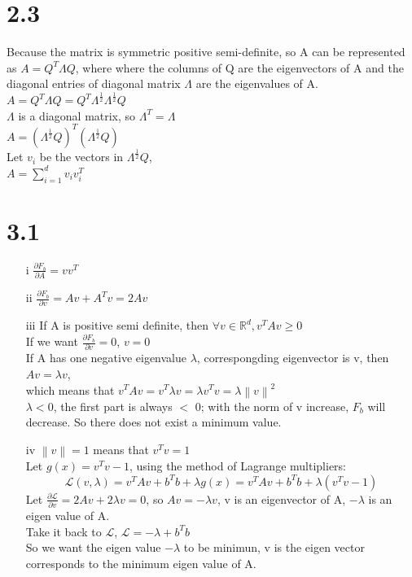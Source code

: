 \documentclass[12pt]{article}
\begin{document}
\section*{2.3}
Because the matrix is symmetric positive semi-definite, so A can be represented as $A = Q^T\Lambda Q$, where where the columns of Q are the eigenvectors of A and the diagonal entries of diagonal matrix $\Lambda$ are the eigenvalues of A.\\
$A = Q^T\Lambda Q=Q^T\Lambda ^{\frac{1}{2}}\Lambda ^{\frac{1}{2}}Q$\\
$\Lambda$ is a diagonal matrix, so $\Lambda^T = \Lambda$\\
$A =  (\Lambda ^{\frac{1}{2}}Q)^T(\Lambda ^{\frac{1}{2}}Q)$\\
Let $v_i$ be the vectors in $ \Lambda ^{\frac{1}{2}}Q$, \\
$A = \sum_{i=1}^{d}v_iv_i^T$\\



\section*{3.1}
\begin{enumerate}
\item[i]
$\frac{\partial F_b}{\partial A}=vv^T$\\

\item[ii]
$\frac{\partial F_b}{\partial v}=Av+A^Tv = 2Av$\\

\item[iii]
If A is positive semi definite, then $\forall v \in \mathbb{R}^d, v^TAv\geqslant 0$\\
If we want  $\frac{\partial F_b}{\partial v}=0$, $v=0$\\

If A has one negative eigenvalue $\lambda$, correspongding eigenvector is v, then $Av = \lambda v$,\\
which means that $v^TAv = v^T\lambda v=\lambda v^Tv=\lambda \left \| v \right \|^2$\\
$\lambda <0$, the first part is always $<$ 0; with the norm of v increase, $F_b$ will decrease. So there does not exist a minimum value.

\item[iv]
$\left \| v \right \| = 1$ means that $v^Tv= 1$\\
Let $g(x) = v^Tv - 1$, using the method of Lagrange multipliers:\\
$$ \mathcal{L}(v,\lambda )=v^TAv+b^Tb+\lambda g(x) =v^TAv+b^Tb+\lambda (v^Tv-1)$$
Let $\frac{\partial \mathcal{L}}{\partial v}=2Av+2\lambda v=0$, so $Av=-\lambda v$, v is an eigenvector of A, $-\lambda$ is an eigen value of A.\\
Take it back to $\mathcal{L}$, $\mathcal{L}=-\lambda +b^Tb$\\
So we want the eigen value $-\lambda$ to be minimun, v is the eigen vector corresponds to the minimum eigen value of A.



\end{enumerate}
\end{document}
